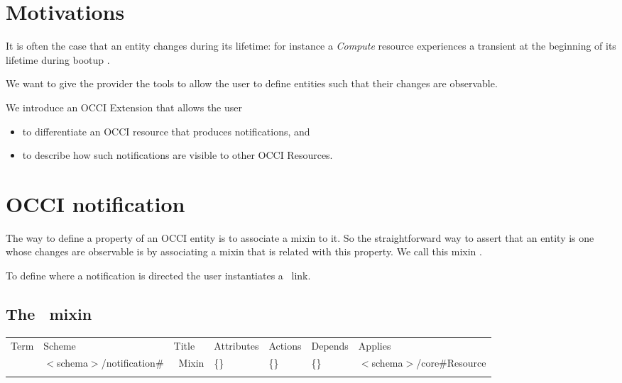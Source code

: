 \documentclass[10pt,a4paper]{article}
\begin{document}
\section{Motivations}

It is often the case that an entity changes during its lifetime: for instance a {\em Compute} resource experiences a transient at the beginning of its lifetime during bootup \cite{occi:infrastructure}.

We want to give the provider the tools to allow the user to define entities such that their changes are observable.

We introduce an OCCI Extension that allows the user

\begin{itemize} 
\item to differentiate an OCCI resource that produces notifications, and 
\item to describe how such notifications are visible to other OCCI Resources.
\end{itemize}

\section{OCCI notification}

The way to define a property of an OCCI entity is to associate a mixin to it. So the straightforward way to assert that an entity is one whose changes are observable is by associating a mixin that is related with this property. We call this mixin \smx.

To define where a notification is directed the user instantiates a \ntfl\ link.



\subsection{The \smx\ mixin}

 {
	\begin{tabular}{lllllll}
	\toprule
	Term & Scheme & Title & Attributes & Actions & Depends & Applies \\
	\colrule
	\smx &  $<$schema$>$/notification\# & \smx\ Mixin 
	& \{\} & \{\} & \{\} & $<$schema$>$/core\#Resource \\
	\botrule
	\end{tabular}
}
\end{document}
